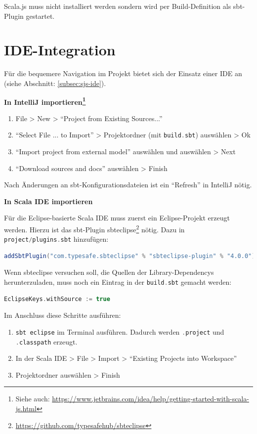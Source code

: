 \documentclass[a4paper, 12pt, hidelinks, listof=totoc, listoftables=totoc, bibliography=totoc]{scrreprt}
\newcommand{\code}[1]{\lstinline[language=Scala, style=inline]|#1|}
\newcommand{\MyMiniSec}[1]{\rmfamily\fontsize{12}{15}\selectfont
	\vspace{7pt}\textbf{#1} %
}
\begin{document}
Scala.js muss nicht installiert werden sondern wird per Build-Definition als sbt-Plugin gestartet.


\section{IDE-Integration}

Für die bequemere Navigation im Projekt bietet sich der Einsatz einer \ac{IDE} an (siehe Abschnitt: \ref{subsec:sjs-ide}).


\MyMiniSec{In IntelliJ importieren\footnote{Siehe auch: \url{https://www.jetbrains.com/idea/help/getting-started-with-scala-js.html}}}

\begin{enumerate}
\item File  >  New  >  "`Project from Existing Sources..."'
\item "`Select File ... to Import"'  >  Projektordner (mit \code{build.sbt}) auswählen  >  Ok
\item "`Import project from external model"' auswählen und auswählen  >  Next
\item "`Download sources and docs"' auswählen  >  Finish
\end{enumerate}

Nach Änderungen an sbt-Konfigurationsdateien ist ein "`Refresh"' in IntelliJ nötig.



\MyMiniSec{In Scala IDE importieren}

Für die Eclipse-basierte Scala IDE muss zuerst ein Eclipse-Projekt erzeugt werden. Hierzu ist das sbt-Plugin sbteclipse\footnote{\url{https://github.com/typesafehub/sbteclipse}} nötig. Dazu in \code{project/plugins.sbt} hinzufügen:

\begin{lstlisting}[language=Scala, style=snippet]
addSbtPlugin("com.typesafe.sbteclipse" % "sbteclipse-plugin" % "4.0.0")
\end{lstlisting}

Wenn sbteclipse versuchen soll, die Quellen der Library-Dependencys herunterzuladen, muss noch ein Eintrag in der \code{build.sbt} gemacht werden:

\begin{lstlisting}[language=Scala, style=snippet]
EclipseKeys.withSource := true
\end{lstlisting}

Im Anschluss diese Schritte ausführen:

\begin{enumerate}
\item \code{sbt eclipse} im Terminal ausführen. Dadurch werden
\code{.project} und \code{.classpath} erzeugt.
\item In der Scala IDE > File > Import > "`Existing Projects into Workspace"'
\item Projektordner auswählen > Finish
\end{enumerate}
\end{document}
